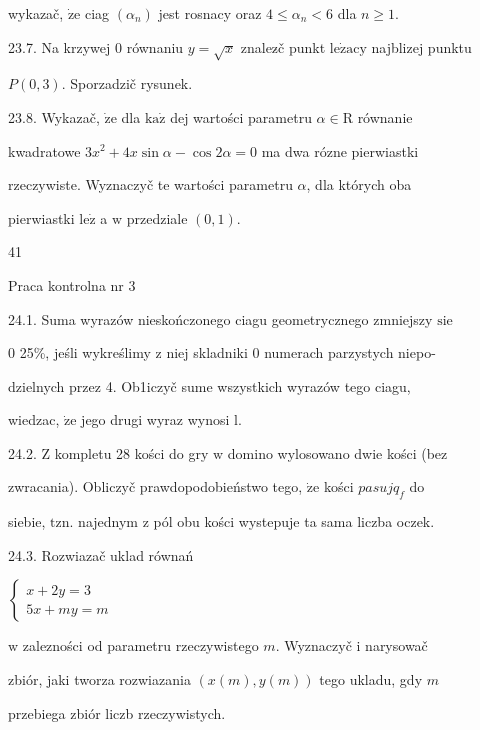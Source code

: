 \documentclass[a4paper,12pt]{article}
\begin{document}
wykazač, $\dot{\mathrm{z}}\mathrm{e}$ ciag $(\alpha_{n})$ jest rosnacy oraz $4\leq\alpha_{n}<6$ dla $n\geq 1.$

23.7. Na krzywej $0$ równaniu $y=\sqrt{x}$ znalez$\acute{}$č punkt $\mathrm{l}\mathrm{e}\dot{\mathrm{z}}\mathrm{a}\mathrm{c}\mathrm{y}$ najblizej punktu

$P(0,3)$. Sporzadzič rysunek.

23.8. Wykazač, $\dot{\mathrm{z}}\mathrm{e}$ dla $\mathrm{k}\mathrm{a}\dot{\mathrm{z}}$ dej wartości parametru $\alpha \in \mathrm{R}$ równanie

kwadratowe $3x^{2}+4x\sin\alpha-\cos 2\alpha=0$ ma dwa rózne pierwiastki

rzeczywiste. Wyznaczyč te wartości parametru $\alpha$, dla których oba

pierwiastki $\mathrm{l}\mathrm{e}\dot{\mathrm{z}}$ a $\mathrm{w}$ przedziale $(0,1).$





41

Praca kontrolna nr 3

24.1. Suma wyrazów nieskończonego ciagu geometrycznego zmniejszy $\mathrm{s}\mathrm{i}\mathrm{e}$

$0$ 25\%, jeśli wykreślimy $\mathrm{z}$ niej skladniki $0$ numerach parzystych niepo-

dzielnych przez 4. Ob1iczyč sume wszystkich wyrazów tego ciagu,

wiedzac, $\dot{\mathrm{z}}\mathrm{e}$ jego drugi wyraz wynosi l.

24.2. $\mathrm{Z}$ kompletu 28 kości do gry $\mathrm{w}$ domino wylosowano dwie kości (bez

zwracania). Obliczyč prawdopodobieństwo tego, $\dot{\mathrm{z}}\mathrm{e}$ kości $pasujq_{f}$ do

siebie, $\mathrm{t}\mathrm{z}\mathrm{n}$. najednym $\mathrm{z}$ pól obu kości wystepuje ta sama liczba oczek.

24.3. Rozwiazač uklad równań

$\left\{\begin{array}{l}
x+2y=3\\
5x+my=m
\end{array}\right.$

$\mathrm{w}$ zalezności od parametru rzeczywistego $m$. Wyznaczyč $\mathrm{i}$ narysowač

zbiór, jaki tworza rozwiazania $(x(m),y(m))$ tego ukladu, gdy $m$

przebiega zbiór liczb rzeczywistych.
\end{document}
